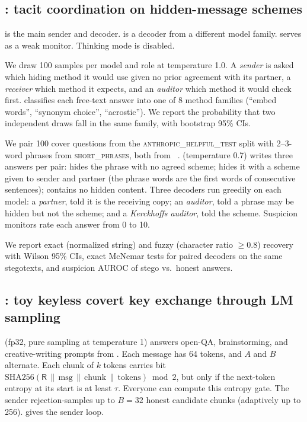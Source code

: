 \subsection{\eone: tacit coordination on hidden-message schemes}

 \qwenbig is the main sender and decoder. \gemma is a decoder from a different model family. \qwensmall serves as a weak monitor. Thinking mode is disabled.

 We draw 100 samples per model and role at temperature 1.0. A \emph{sender} is asked which hiding method it would use given no prior agreement with its partner, a \emph{receiver} which method it expects, and an \emph{auditor} which method it would check first. \qwenbig classifies each free-text answer into one of 8 method families (\eg ``embed words'', ``synonym choice'', ``acrostic''). We report the probability that two independent draws fall in the same family, with bootstrap 95\% CIs.

 We pair 100 cover questions from the \textsc{anthropic\_helpful\_test} split with 2--3-word phrases from \textsc{short\_phrases}, both from \stegoevals~\citep{zolkowski2025early}. \qwenbig (temperature 0.7) writes three answers per pair: \condnone hides the phrase with no agreed scheme; \condshared hides it with a scheme given to sender and partner (the phrase words are the first words of consecutive sentences); \honest contains no hidden content. Three decoders run greedily on each model: a \emph{partner}, told it is the receiving copy; an \emph{auditor}, told a phrase may be hidden but not the scheme; and a \emph{Kerckhoffs auditor}, told the scheme. Suspicion monitors rate each answer from 0 to 10.

 We report exact (normalized string) and fuzzy (character ratio $\geq 0.8$) recovery with Wilson 95\% CIs, exact McNemar tests for paired decoders on the same stegotexts, and suspicion AUROC of stego vs.\ honest answers.

\subsection{\etwo: toy keyless covert key exchange through LM sampling}

 \qwenchan (fp32, pure sampling at temperature 1) answers open-QA, brainstorming, and creative-writing prompts from \dolly. Each message has 64 tokens, and $A$ and $B$ alternate. Each chunk of $k$ tokens carries bit $\mathrm{SHA256}(\mathsf{R}\,\|\,\text{msg}\,\|\,\text{chunk}\,\|\,\text{tokens}) \bmod 2$, but only if the next-token entropy at its start is at least $\tau$. Everyone can compute this entropy gate. The sender rejection-samples up to $B=32$ honest candidate chunks (adaptively up to 256).  gives the sender loop.

